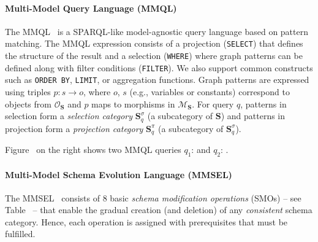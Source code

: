 \paragraph{Multi-Model Query Language (MMQL)}
The MMQL~\citep{koupil2023universal} is a SPARQL-like model-agnostic query language based on pattern matching. %
The MMQL expression consists of a projection (\texttt{SELECT}) that defines the structure of the result and a selection (\texttt{WHERE}) where graph patterns can be defined along with filter conditions (\texttt{FILTER}). We also support common constructs such as \texttt{ORDER BY}, \texttt{LIMIT}, or aggregation functions. Graph patterns are expressed using triples $p : s \rightarrow o$, where $o$, $s$ (e.g., variables or constants) correspond to objects from $\mathcal{O}_\mathbf{S}$ and $p$ maps to morphisms in $\mathcal{M}_\mathbf{S}$. For query $q$, patterns in selection form a \textit{selection category} $\mathbf{S}_q^{\sigma}$ (a subcategory of $\mathbf{S}$) and patterns in projection form a \textit{projection category} $\mathbf{S}_{q}^{\pi}$ (a  subcategory of $\mathbf{S}_q^{\sigma}$). 

\begin{example}
Figure~ on the right shows two MMQL queries $q_1$:  and $q_2$: .
\end{example}

\paragraph{Multi-Model Schema Evolution Language (MMSEL)}
The MMSEL~\citep{cikm_2022} consists of 8 basic \textit{schema modification operations} (SMOs) -- see Table~ -- that enable the gradual creation (and deletion) of any \textit{consistent} schema category. Hence, each operation is assigned with prerequisites that must be fulfilled. 




